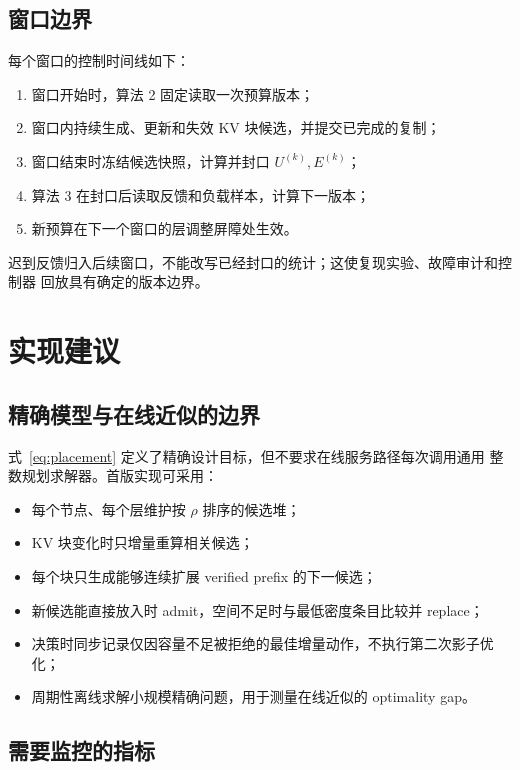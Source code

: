 \documentclass[UTF8,11pt,a4paper,fontset=fandol]{ctexart}
\begin{document}
\subsection{窗口边界}

每个窗口的控制时间线如下：

\begin{enumerate}
  \item 窗口开始时，算法 2 固定读取一次预算版本；
  \item 窗口内持续生成、更新和失效 KV 块候选，并提交已完成的复制；
  \item 窗口结束时冻结候选快照，计算并封口 $U^{(k)},E^{(k)}$；
  \item 算法 3 在封口后读取反馈和负载样本，计算下一版本；
  \item 新预算在下一个窗口的层调整屏障处生效。
\end{enumerate}

迟到反馈归入后续窗口，不能改写已经封口的统计；这使复现实验、故障审计和控制器
回放具有确定的版本边界。

\section{实现建议}

\subsection{精确模型与在线近似的边界}

式~\eqref{eq:placement} 定义了精确设计目标，但不要求在线服务路径每次调用通用
整数规划求解器。首版实现可采用：

\begin{itemize}
  \item 每个节点、每个层维护按 $\rho$ 排序的候选堆；
  \item KV 块变化时只增量重算相关候选；
  \item 每个块只生成能够连续扩展 verified prefix 的下一候选；
  \item 新候选能直接放入时 admit，空间不足时与最低密度条目比较并 replace；
  \item 决策时同步记录仅因容量不足被拒绝的最佳增量动作，不执行第二次影子优化；
  \item 周期性离线求解小规模精确问题，用于测量在线近似的 optimality gap。
\end{itemize}

\subsection{需要监控的指标}
\end{document}
